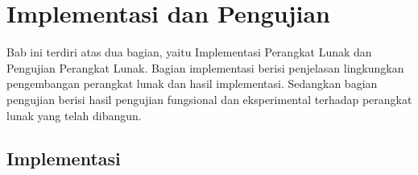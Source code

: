 \chapter{Implementasi dan Pengujian}
\label{chap:implementasiPengujian}

Bab ini terdiri atas dua bagian, yaitu Implementasi Perangkat Lunak dan Pengujian Perangkat Lunak. Bagian implementasi berisi penjelasan lingkungkan pengembangan perangkat lunak dan hasil implementasi. Sedangkan bagian pengujian berisi hasil pengujian fungsional dan eksperimental terhadap perangkat lunak yang telah dibangun.

\section{Implementasi}
\label{sec:implementasi}

